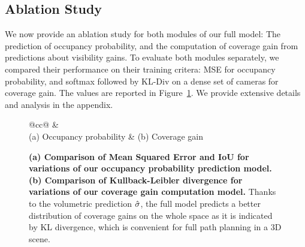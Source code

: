 \subsection{Ablation Study}

We now provide an ablation study for both modules of our full model: The prediction of occupancy probability, and the computation of coverage gain from predictions about visibility gains. To evaluate both modules separately, we compared their performance on their training critera: MSE for occupancy probability, and softmax followed by KL-Div on a dense set of cameras for coverage gain. The values are reported in Figure~\ref{fig:ablation_study}. We provide extensive details and analysis in the appendix.

\begin{figure}%
    \centering
    \begin{tabular}{@{}cc@{}}
  \hspace{-0.5cm}
 &
\\[7mm]
(a) Occupancy probability & (b) Coverage gain \\
    \end{tabular}
    \caption{\label{fig:ablation_study} {\bf (a) Comparison of Mean Squared Error and IoU for variations of our occupancy probability prediction model. (b) Comparison of Kullback-Leibler divergence for variations of our coverage gain computation model.} Thanks to the volumetric prediction $\hat{\sigma}$, the full model predicts a better distribution of coverage gains on the whole space as it is indicated by KL divergence, which is convenient for full path planning in a 3D scene.}%
\end{figure}

